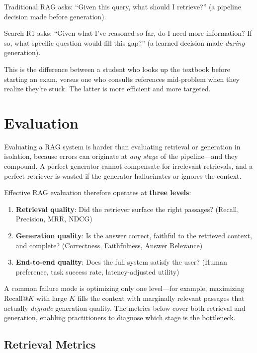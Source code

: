 \begin{intuitionbox}
Traditional RAG asks: ``Given this query, what should I retrieve?'' (a pipeline decision made before generation).

Search-R1 asks: ``Given what I’ve reasoned so far, do I need more information? If so, what specific question would fill this gap?'' (a learned decision made \emph{during} generation).

This is the difference between a student who looks up the textbook before starting an exam, versus one who consults references mid-problem when they realize they’re stuck. The latter is more efficient and more targeted.
\end{intuitionbox}

\section{Evaluation}
\label{evaluation}

Evaluating a RAG system is harder than evaluating retrieval or generation in isolation, because errors can originate at \emph{any stage} of the pipeline---and they compound. A perfect generator cannot compensate for irrelevant retrievals, and a perfect retriever is wasted if the generator hallucinates or ignores the context.

Effective RAG evaluation therefore operates at \textbf{three levels}:

\begin{enumerate}
  \item \textbf{Retrieval quality}: Did the retriever surface the right passages? (Recall, Precision, MRR, NDCG)
  \item \textbf{Generation quality}: Is the answer correct, faithful to the retrieved context, and complete? (Correctness, Faithfulness, Answer Relevance)
  \item \textbf{End-to-end quality}: Does the full system satisfy the user? (Human preference, task success rate, latency-adjusted utility)
\end{enumerate}

A common failure mode is optimizing only one level---for example, maximizing Recall@$K$ with large $K$ fills the context with marginally relevant passages that actually \emph{degrade} generation quality. The metrics below cover both retrieval and generation, enabling practitioners to diagnose which stage is the bottleneck.

\subsection{Retrieval Metrics}
\label{retrieval-metrics}

